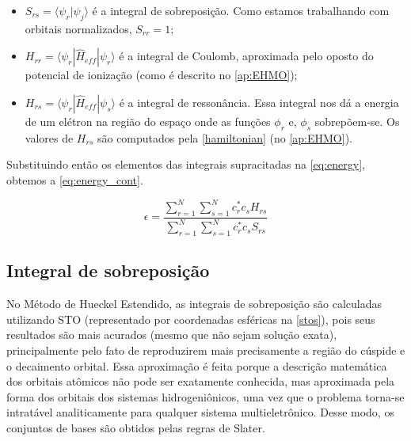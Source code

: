 \begin{itemize}
    \item $\displaystyle S_{rs} = \langle \psi_r | \psi_j \rangle$ é a integral de sobreposição. Como estamos trabalhando com orbitais normalizados, $S_{rr} = 1$;
    
    \item $\displaystyle H_{rr} = \langle \psi_r | \hat{H}_{eff} | \psi_r \rangle$ é a integral de Coulomb, aproximada pelo oposto do potencial de ionização (como é descrito no \autoref{ap:EHMO});
    
    \item $\displaystyle H_{rs} = \langle \psi_r | \hat{H}_{eff} | \psi_s \rangle$ é a integral de ressonância. Essa integral nos dá a energia de um elétron na região do espaço onde as funções $\phi_r$ e, $\phi_s$ sobrepõem-se. Os valores de $H_{rs}$ são computados pela \autoref{hamiltonian} (no \autoref{ap:EHMO}).
\end{itemize}

Substituindo então os elementos das integrais supracitadas na \autoref{eq:energy}, obtemos a \autoref{eq:energy_cont}.

\begin{equation}
\label{eq:energy_cont}
    \epsilon = \frac{\displaystyle \sum_{r=1}^{N} \sum_{s=1}^{N} c^*_r c_s H_{rs}}{\displaystyle \sum_{r=1}^{N} \sum_{s=1}^{N} c^*_r c_s S_{rs}}
\end{equation}

\subsection{Integral de sobreposição}\label{sec:overlap}

No Método de Hueckel Estendido, as integrais de sobreposição são calculadas utilizando \gls{STO} (representado por coordenadas esféricas na \autoref{stos}), pois seus resultados são mais acurados (mesmo que não sejam solução exata), principalmente pelo fato de reproduzirem mais precisamente a região do cúspide e o decaimento orbital. Essa aproximação é feita porque a descrição matemática dos orbitais atômicos não pode ser exatamente conhecida, mas aproximada pela forma dos orbitais dos sistemas hidrogeniônicos, uma vez que o problema torna-se intratável analiticamente para qualquer sistema multieletrônico. Desse modo, os conjuntos de bases são obtidos pelas regras de Slater\autocite{Slater1930, Lu2006}.

